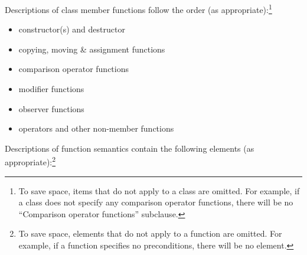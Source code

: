 \pnum
Descriptions of class member functions follow the order (as
appropriate):\footnote{To save space, items that do not apply to a class are omitted.
For example, if a class does not specify any comparison operator functions, there
will be no ``Comparison operator functions'' subclause.}

\begin{itemize}
\item constructor(s) and destructor
\item copying, moving \& assignment functions
\item comparison operator functions
\item modifier functions
\item observer functions
\item operators and other non-member functions
\end{itemize}

\pnum
Descriptions of function semantics contain the following elements (as
appropriate):\footnote{To save space, elements that do not apply to a function are omitted.
For example, if a function specifies no
preconditions, there will be no \expects element.}

